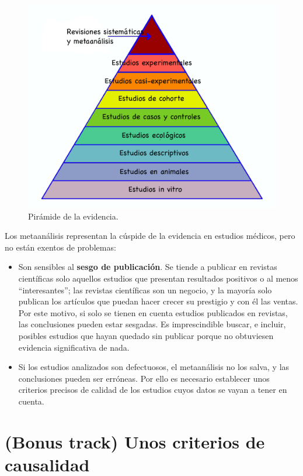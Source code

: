\documentclass[
]{book}
\theoremstyle{definition}
\theoremstyle{definition}
\theoremstyle{definition}
\theoremstyle{definition}
\theoremstyle{remark}
\begin{document}
\begin{figure}

{\centering \includegraphics[width=0.8\linewidth]{INREMDN_files/figure-html/systematic} 

}

\caption{Pirámide de la evidencia.}\label{fig:piramide}
\end{figure}

Los metaanálisis representan la cúspide de la evidencia en estudios médicos, pero no están exentos de problemas:

\begin{itemize}
\item
  Son sensibles al \textbf{sesgo de publicación}. Se tiende a publicar en revistas científicas solo aquellos estudios que presentan resultados positivos o al menos ``interesantes''; las revistas científicas son un negocio, y la mayoría solo publican los artículos que puedan hacer crecer su prestigio y con él las ventas. Por este motivo, si solo se tienen en cuenta estudios publicados en revistas, las conclusiones pueden estar sesgadas. Es imprescindible buscar, e incluir, posibles estudios que hayan quedado sin publicar porque no obtuviesen evidencia significativa de nada.
\item
  Si los estudios analizados son defectuosos, el metaanálisis no los salva, y las conclusiones pueden ser erróneas. Por ello es necesario establecer unos criterios precisos de calidad de los estudios cuyos datos se vayan a tener en cuenta.
\end{itemize}

\hypertarget{sec:causalidad}{%
\section{(Bonus track) Unos criterios de causalidad}\label{sec:causalidad}}
\end{document}
